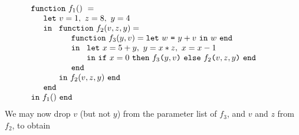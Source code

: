 \begin{equation}
\label{FunctionalConstructionProgramLC1}
\begin{array}{l}
\texttt{function}\ f_1()\ = \\
  \quad
  \begin{array}{l}
     \texttt{let}\ v = 1, \ 
                   z = 8, \ 
                   y = 4\\
     \texttt{in}\ 
     \begin{array}[t]{l}
       \texttt{function}\ f_2(v,z,y) = \\
       \quad \begin{array}{l}  
               \texttt{function}\ f_3(y,v) = \letin w {y+v} w\\
               \texttt{in}\
               \begin{array}[t]{l}
                  \texttt{let}\ x = {5+y},\
                                y = {x*z},\
                                x = {x-1}\\ 
                  \texttt{in}\ 
                     \ite {x=0} {\call {f_3} {y,v}} {\call {f_2} {v,z,y}}\
                  \texttt{end}\
               \end{array}\\
               \texttt{end}
             \end{array}\\
       \texttt{in}\ f_2(v,z,y)\ \texttt{end}
     \end{array}\\
     \texttt{end}
  \end{array}\\
  \texttt{in}\ f_1()\ \texttt{end}
\end{array}
\end{equation}
We may now drop $v$ (but not $y$) from the parameter list of $f_3$,
and $v$ and $z$ from $f_2$, to obtain

